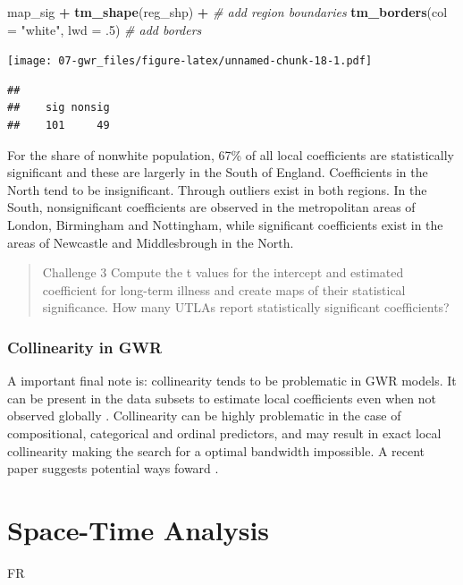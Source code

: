 \documentclass[]{book}
\newenvironment{Shaded}{\begin{snugshade}}{\end{snugshade}}
\newcommand{\KeywordTok}[1]{\textcolor[rgb]{0.13,0.29,0.53}{\textbf{#1}}}
\newcommand{\DataTypeTok}[1]{\textcolor[rgb]{0.13,0.29,0.53}{#1}}
\newcommand{\DecValTok}[1]{\textcolor[rgb]{0.00,0.00,0.81}{#1}}
\newcommand{\StringTok}[1]{\textcolor[rgb]{0.31,0.60,0.02}{#1}}
\newcommand{\CommentTok}[1]{\textcolor[rgb]{0.56,0.35,0.01}{\textit{#1}}}
\newcommand{\OperatorTok}[1]{\textcolor[rgb]{0.81,0.36,0.00}{\textbf{#1}}}
\newcommand{\NormalTok}[1]{#1}
\begin{document}
\begin{Shaded}
\begin{Highlighting}[]
\NormalTok{map_sig }\OperatorTok{+}\StringTok{ }\KeywordTok{tm_shape}\NormalTok{(reg_shp) }\OperatorTok{+}\StringTok{ }\CommentTok{# add region boundaries}
\StringTok{  }\KeywordTok{tm_borders}\NormalTok{(}\DataTypeTok{col =} \StringTok{"white"}\NormalTok{, }\DataTypeTok{lwd =}\NormalTok{ .}\DecValTok{5}\NormalTok{) }\CommentTok{# add borders}
\end{Highlighting}
\end{Shaded}

\texttt{[image: 07-gwr\_files/figure-latex/unnamed-chunk-18-1.pdf]}

\begin{Shaded}
\end{Shaded}

\begin{verbatim}
## 
##    sig nonsig 
##    101     49
\end{verbatim}

For the share of nonwhite population, 67\% of all local coefficients are
statistically significant and these are largerly in the South of
England. Coefficients in the North tend to be insignificant. Through
outliers exist in both regions. In the South, nonsignificant
coefficients are observed in the metropolitan areas of London,
Birmingham and Nottingham, while significant coefficients exist in the
areas of Newcastle and Middlesbrough in the North.

\begin{quote}
Challenge 3 Compute the t values for the intercept and estimated
coefficient for long-term illness and create maps of their statistical
significance. How many UTLAs report statistically significant
coefficients?
\end{quote}

\subsection{Collinearity in GWR}\label{collinearity-in-gwr}

A important final note is: collinearity tends to be problematic in GWR
models. It can be present in the data subsets to estimate local
coefficients even when not observed globally
\citet{wheeler2005multicollinearity}. Collinearity can be highly
problematic in the case of compositional, categorical and ordinal
predictors, and may result in exact local collinearity making the search
for a optimal bandwidth impossible. A recent paper suggests potential
ways foward \citep{comber2020gwr}.

\chapter{Space-Time Analysis}\label{space-time-analysis}

FR


\end{document}
